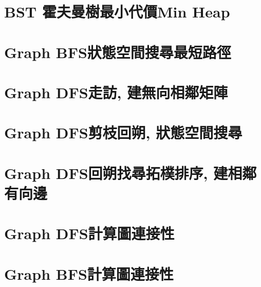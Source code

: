 \documentclass{article}
\begin{document}
\begin{multicols}{2}
\section{BST 霍夫曼樹最小代價Min Heap}



\section{Graph BFS狀態空間搜尋最短路徑}



\section{Graph DFS走訪, 建無向相鄰矩陣}



\section{Graph DFS剪枝回朔, 狀態空間搜尋}



\section{Graph DFS回朔找尋拓樸排序, 建相鄰有向邊}



\section{Graph DFS計算圖連接性}



\section{Graph BFS計算圖連接性}




\end{multicols}
\end{document}
